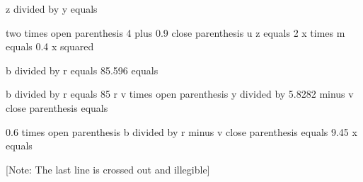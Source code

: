 z divided by y equals

two times open parenthesis 4 plus 0.9 close parenthesis u z equals 2 x times m equals 0.4 x squared

b divided by r equals 85.596 equals

b divided by r equals 85 r v times open parenthesis y divided by 5.8282 minus v close parenthesis equals

0.6 times open parenthesis b divided by r minus v close parenthesis equals 9.45 x equals

[Note: The last line is crossed out and illegible]